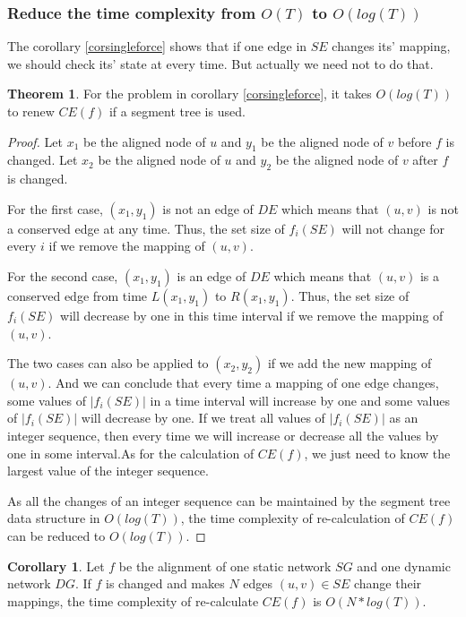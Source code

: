 \documentclass{bioinfo}
\theoremstyle{definition}
\newtheorem{thm}{\textbf{Theorem}}[section]%
\newtheorem{cor}{\textbf{Corollary}}[thm]%
\begin{document}
\begin{methods}
\subsubsection{Reduce the time complexity from $O(T)$ to $O(log(T))$}
The corollary \ref{corsingleforce} shows that if one edge in $SE$ changes its' mapping, we should check its' state at every time. But actually we need not to do that.
\begin{thm}
\label{thmsingletree}
For the problem in corollary \ref{corsingleforce}, it takes $O(log(T))$ to renew $CE(f)$ if a segment tree is used.
\end{thm}
\begin{proof}
Let $x_1$ be the aligned node of $u$ and $y_1$ be the aligned node of $v$ before $f$ is changed. Let $x_2$ be the aligned node of $u$ and $y_2$ be the aligned node of $v$ after $f$ is changed.

For the first case, $(x_1,y_1)$ is not an edge of $DE$ which means that $(u,v)$ is not a conserved edge at any time. Thus, the set size of $f_i(SE)$ will not change for every $i$ if we remove the mapping of $(u,v)$.

For the second case, $(x_1,y_1)$ is an edge of $DE$ which means that $(u,v)$ is a conserved edge from time $L(x_1,y_1)$ to $R(x_1,y_1)$. Thus, the set size of $f_i(SE)$ will decrease by one in this time interval if we remove the mapping of $(u,v)$.

The two cases can also be applied to $(x_2,y_2)$ if we add the new mapping of $(u,v)$. And we can conclude that every time a mapping of one edge changes, some values of $|f_i(SE)|$ in a time interval will increase by one and some values of $|f_i(SE)|$ will decrease by one. If we treat all values of $|f_i(SE)|$ as an integer sequence, then every time we will increase or decrease all the values by one in some interval.As for the calculation of $CE(f)$, we just need to know the largest value of the integer sequence.

As all the changes of an integer sequence can be maintained by the segment tree data structure in $O(log(T))$, the time complexity of re-calculation of $CE(f)$ can be reduced to $O(log(T))$.
\end{proof}

\begin{cor}
\label{corntree}
Let $f$ be the alignment of one static network $SG$ and one dynamic network $DG$. If $f$ is changed and makes $N$ edges $(u,v)\in SE$ change their mappings, the time complexity of re-calculate $CE(f)$ is $O(N*log(T))$. 
\end{cor}

\end{methods}
\end{document}
